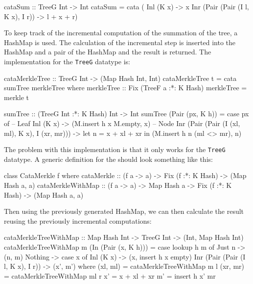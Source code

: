 \begin{haskell}
cataSum :: TreeG Int -> Int
cataSum = cata (\case
  Inl (K x)                         -> x         
  Inr (Pair (Pair (I l, K x), I r)) -> l + x + r)
\end{haskell}

\newpage
To keep track of the incremental computation of the summation of the tree, a HashMap\cite{HaskellDataMap} is used. The calculation of the incremental step is inserted into the HashMap and a pair of the HashMap and the result is returned. The implementation for the \texttt{TreeG} datatype is: 

\begin{haskell}
cataMerkleTree :: TreeG Int -> (Map Hash Int, Int)
cataMerkleTree t = cata sumTree merkleTree
  where
    merkleTree :: Fix (TreeF a :*: K Hash)
    merkleTree = merkle t

    sumTree :: (TreeG Int :*: K Hash) Int -> Int
    sumTree (Pair (px, K h)) = case px of
      -- Leaf  
      Inl (K x)                       
        -> (M.insert h x M.empty, x) 
      -- Node
      Inr (Pair (Pair (I (xl, ml), K x), I (xr, mr))) 
        -> let n = x + xl + xr 
           in (M.insert h n (ml <> mr), n) 
\end{haskell}

The problem with this implementation is that it only works for the \texttt{TreeG} datatype. A generic definition for the should look something like this:

\begin{haskell}
class CataMerkle f where
    cataMerkle :: (f a -> a) -> Fix (f :*: K Hash) -> (Map Hash a, a)
    cataMerkleWithMap :: (f a -> a) -> Map Hash a -> Fix (f :*: K Hash) 
                      -> (Map Hash a, a)
\end{haskell}

\newpage
Then using the previously generated HashMap, we can then calculate the result reusing the previously incremental computations:

\begin{haskell}
cataMerkleTreeWithMap :: Map Hash Int -> TreeG Int -> (Int, Map Hash Int)
cataMerkleTreeWithMap m (In (Pair (x, K h))) = 
  case lookup h m of
    Just n  -> (n, m)
    Nothing -> case x of
      Inl (K x) -> (x, insert h x empty)
      Inr (Pair (Pair (I l, K x), I r)) -> (x', m')
        where
          (xl, ml) = cataMerkleTreeWithMap m l
          (xr, mr) = cataMerkleTreeWithMap ml r
          x' = x + xl + xr
          m' = insert h x' mr
\end{haskell}

